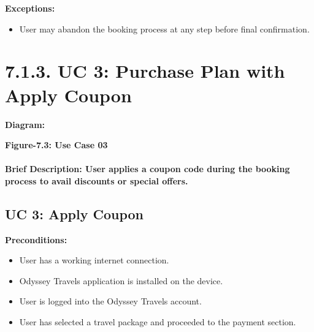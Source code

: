 \documentclass{scrreprt}
\begin{document}
\textbf{Exceptions:}
\begin{itemize}
    \item User may abandon the booking process at any step before final confirmation.
\end{itemize}

\section*{\textbf{7.1.3. UC 3: Purchase Plan with Apply Coupon}}
\textbf{Diagram:}
\newline
\newline
{}
\begin{center}
    \parbox{0.8\textwidth}{ 
        \centering
        \textbf{Figure-7.3: Use Case 03}
    }
\end{center}


\paragraph {\textnormal{Brief Description: 
User applies a coupon code during the booking process to avail discounts or special offers.}}

\subsection*{\textbf{UC 3: Apply Coupon}}

\textbf{Preconditions:}
\begin{itemize}
    \item User has a working internet connection.
    \item Odyssey Travels application is installed on the device.
    \item User is logged into the Odyssey Travels account.
    \item User has selected a travel package and proceeded to the payment section.
\end{itemize}
\end{document}
